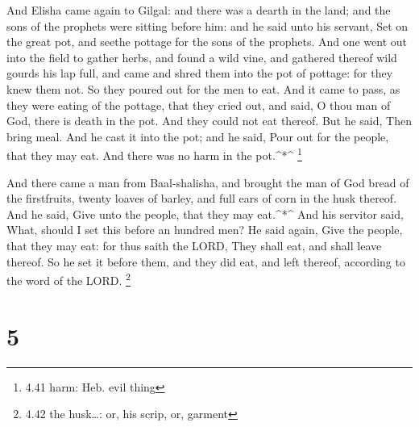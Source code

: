  And Elisha came again to Gilgal: and there was a dearth in
the land; and the sons of the prophets were sitting before him: and he
said unto his servant, Set on the great pot, and seethe pottage for the
sons of the prophets.  And one went out into the field to
gather herbs, and found a wild vine, and gathered thereof wild gourds
his lap full, and came and shred them into the pot of pottage: for they
knew them not.  So they poured out for the men to eat. And
it came to pass, as they were eating of the pottage, that they cried
out, and said, O thou man of God, there is death in the pot. And they
could not eat thereof.  But he said, Then bring meal. And
he cast it into the pot; and he said, Pour out for the people, that they
may eat. And there was no harm in the pot.\^{}*\^{} \footnote{4.41 harm:
  Heb. evil thing}

 And there came a man from Baal-shalisha, and brought the
man of God bread of the firstfruits, twenty loaves of barley, and full
ears of corn in the husk thereof. And he said, Give unto the people,
that they may eat.\^{}*\^{}  And his servitor said, What,
should I set this before an hundred men? He said again, Give the people,
that they may eat: for thus saith the LORD, They shall eat, and shall
leave thereof.  So he set it before them, and they did eat,
and left thereof, according to the word of the LORD. \footnote{4.42 the
  husk\ldots: or, his scrip, or, garment}

\hypertarget{section-4}{%
\section{5}\label{section-4}}

